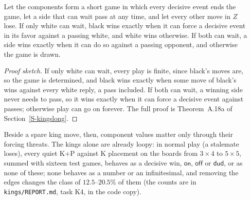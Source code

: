 \begin{theorem}\label{thm:loopy}
Let the components form a short game in which every decisive event ends the game, let a side that can wait pass
at any time, and let every other move in $Z$ lose. If only white can wait, black wins exactly when it can force a decisive
event in its favor against a passing white, and white wins otherwise. If both can wait, a side wins exactly when
it can do so against a passing opponent, and otherwise the game is drawn.
\end{theorem}

\begin{proof}[Proof sketch]
If only white can wait, every play is finite, since black's moves are, so the game is determined, and black
wins exactly when some move of black's wins against every white reply, a pass included. If both can wait, a
winning side never needs to pass, so it wins exactly when it can force a decisive event against passes;
otherwise play can go on forever. The full proof is Theorem~A.18a of Section~\ref{S-kingslong}.
\end{proof}

Beside a spare king move, then, component values matter only through their forcing threats. The kings
alone are already loopy: in normal play (a stalemate loses), every quiet K+P against K placement on the boards
from $3\times4$ to $5\times5$, summed with sixteen test games, behaves as a decisive win, $\textsf{on}$,
$\textsf{off}$ or $\textsf{dud}$, or as none of these; none behaves as a number or an infinitesimal, and removing
the edges changes the class of $12.5$--$20.5\%$ of them  (the counts are in \texttt{kings/REPORT.md}, task K4, in the code copy).

